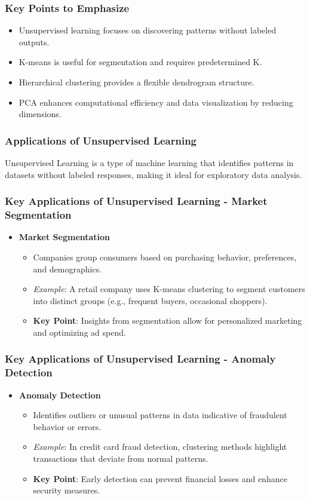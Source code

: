 \documentclass[aspectratio=169]{beamer}
\begin{document}
\begin{frame}[fragile]
    \frametitle{Key Points to Emphasize}
    \begin{itemize}
        \item Unsupervised learning focuses on discovering patterns without labeled outputs.
        \item K-means is useful for segmentation and requires predetermined K.
        \item Hierarchical clustering provides a flexible dendrogram structure.
        \item PCA enhances computational efficiency and data visualization by reducing dimensions.
    \end{itemize}
\end{frame}

\begin{frame}[fragile]
    \frametitle{Applications of Unsupervised Learning}
    Unsupervised Learning is a type of machine learning that identifies patterns in datasets without labeled responses, making it ideal for exploratory data analysis.
\end{frame}

\begin{frame}[fragile]
    \frametitle{Key Applications of Unsupervised Learning - Market Segmentation}
    \begin{itemize}
        \item \textbf{Market Segmentation}
        \begin{itemize}
            \item Companies group consumers based on purchasing behavior, preferences, and demographics.
            \item \textit{Example}: A retail company uses K-means clustering to segment customers into distinct groups (e.g., frequent buyers, occasional shoppers).
            \item \textbf{Key Point}: Insights from segmentation allow for personalized marketing and optimizing ad spend.
        \end{itemize}
    \end{itemize}
\end{frame}

\begin{frame}[fragile]
    \frametitle{Key Applications of Unsupervised Learning - Anomaly Detection}
    \begin{itemize}
        \item \textbf{Anomaly Detection}
        \begin{itemize}
            \item Identifies outliers or unusual patterns in data indicative of fraudulent behavior or errors.
            \item \textit{Example}: In credit card fraud detection, clustering methods highlight transactions that deviate from normal patterns.
            \item \textbf{Key Point}: Early detection can prevent financial losses and enhance security measures.
        \end{itemize}
    \end{itemize}
\end{frame}
\end{document}
